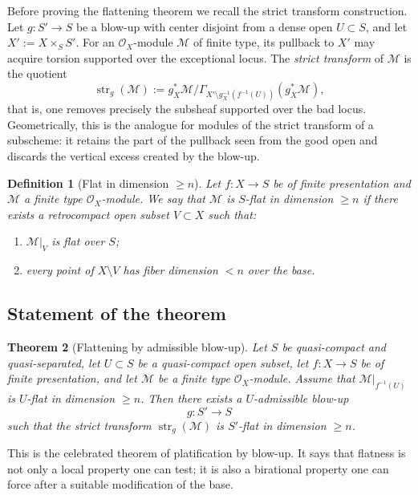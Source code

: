 \documentclass[11pt,oneside]{article}
\newtheorem{theorem}{Theorem}[section]
\newtheorem{definition}[theorem]{Definition}
\newcommand{\M}{\mathcal M}
\newcommand{\OO}{\mathcal O}
\newcommand{\st}{\operatorname{str}}
\begin{document}
Before proving the flattening theorem we recall the strict transform construction.  Let $g\colon S'\to S$ be a blow-up with center disjoint from a dense open $U\subset S$, and let $X':=X\times_S S'$.  For an $\OO_X$-module $\M$ of finite type, its pullback to $X'$ may acquire torsion supported over the exceptional locus.  The \emph{strict transform} of $\M$ is the quotient
\[
\st_g(\M):=g_X^*\M/\Gamma_{X'\setminus g_X^{-1}(f^{-1}(U))}(g_X^*\M),
\]
that is, one removes precisely the subsheaf supported over the bad locus.  Geometrically, this is the analogue for modules of the strict transform of a subscheme: it retains the part of the pullback seen from the good open and discards the vertical excess created by the blow-up.

\begin{definition}[Flat in dimension $\ge n$]
Let $f\colon X\to S$ be of finite presentation and $\M$ a finite type $\OO_X$-module.  We say that $\M$ is \emph{$S$-flat in dimension $\ge n$} if there exists a retrocompact open subset $V\subset X$ such that:
\begin{enumerate}[label=\textup{(\roman*)}]
  \item $\M|_V$ is flat over $S$;
  \item every point of $X\setminus V$ has fiber dimension $<n$ over the base.
\end{enumerate}
\end{definition}

\subsection{Statement of the theorem}

\begin{theorem}[Flattening by admissible blow-up]\label{thm:flattening-blowup}
Let $S$ be quasi-compact and quasi-separated, let $U\subset S$ be a quasi-compact open subset, let $f\colon X\to S$ be of finite presentation, and let $\M$ be a finite type $\OO_X$-module.  Assume that $\M|_{f^{-1}(U)}$ is $U$-flat in dimension $\ge n$.  Then there exists a $U$-admissible blow-up
\[
g\colon S'\to S
\]
such that the strict transform $\st_g(\M)$ is $S'$-flat in dimension $\ge n$.
\end{theorem}

This is the celebrated theorem of platification by blow-up.  It says that flatness is not only a local property one can test; it is also a birational property one can force after a suitable modification of the base.
\end{document}
